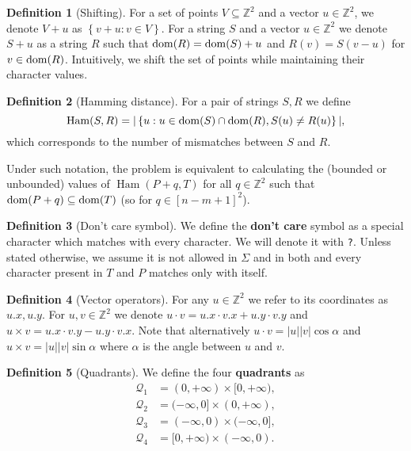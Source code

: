 \documentclass[11pt]{article}
\newcommand{\Z}{\mathbb{Z}}
\renewcommand{\phi}{\varphi}
\newcommand{\set}[1]{\left\lbrace #1 \right\rbrace}
\newcommand{\eq}[1]{\begin{align*} #1 \end{align*}}
\theoremstyle{plain}
\theoremstyle{definition}
\newtheorem{definition}{Definition}
\theoremstyle{remark}
\DeclareMathOperator*{\Ham}{Ham}
\begin{document}
\begin{definition}[Shifting]
	For a set of points $V \subseteq \Z^2$ and a vector $u \in \Z^2$, we denote $V + u$ as $\set{v + u : v \in V}$.
	For a string $S$ and a vector $u \in \Z^2$ we denote $S + u$ as a string $R$ such that
	$\operatorname*{dom}(R) = \operatorname*{dom}(S) + u$ and $R(v) = S(v - u)$ for $v \in \operatorname*{dom}(R)$.
	Intuitively, we shift the set of points while maintaining their character values.
\end{definition}


\begin{definition}[Hamming distance]
	For a pair of strings $S, R$ we define
	$$ \Ham(S, R) = |\set{u : u \in \d{S} \cap \d{R}, S(u) \neq R(u)}|,$$
	which corresponds to the number of mismatches between $S$ and $R$.
\end{definition}


Under such notation, the \HD problem is equivalent to calculating the (bounded or unbounded) values of $ \Ham(P + q, T) $
for all $q \in \Z^2$ such that $\operatorname*{dom}(P + q) \subseteq \operatorname*{dom}(T)$ (so for $q \in [n - m + 1]^2$).


\begin{definition}[Don't care symbol]
	We define the \textbf{don't care} symbol as a special character which matches with every character.
	We will denote it with \texttt{?}.
	Unless stated otherwise, we assume it is not allowed in $\Sigma$ and in both \hd and \HD every character present in $T$ and $P$ matches only with itself.
\end{definition}


\newcommand{\x}[1]{#1.x}
\newcommand{\y}[1]{#1.y}
\newcommand{\h}[1]{\phi \times #1}
\newcommand{\s}[1]{\psi \times #1}
\begin{definition}[Vector operators]
	For any $u \in \Z^2$ we refer to its coordinates as $\x{u}, \y{u}$.
	For $u, v \in \Z^2$ we denote $u \cdot v = \x{u} \cdot \x{v} + \y{u} \cdot \y{v}$
	and $u \times v = \x{u} \cdot \y{v} - \y{u} \cdot \x{v}$.
	Note that alternatively $u \cdot v = |u||v| \cos \alpha$ and $u \times v = |u||v| \sin \alpha$ where $\alpha$ is the angle between $u$ and $v$.
\end{definition}


\newcommand{\Q}{\mathcal{Q}}
\begin{definition}[Quadrants]
	We define the four \textbf{quadrants} as
	\eq{
		\Q_1 &= (0, +\infty) \times [0, +\infty), \\
		\Q_2 &= (-\infty, 0] \times (0, +\infty), \\
		\Q_3 &= (-\infty, 0) \times (-\infty, 0], \\
		\Q_4 &= [0, +\infty) \times (-\infty, 0).
	}
\end{definition}
\end{document}
